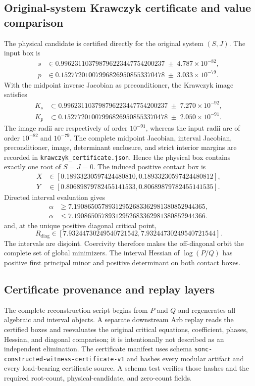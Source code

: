 \subsection{Original-system Krawczyk certificate and value comparison}
The physical candidate is certified directly for the original system $(S,J)$. The input box is
\begin{align*}
s&\in 0.996231103798796223447754200237\;\pm\;4.787\times 10^{-82},\\
p&\in 0.152772010079968269508553370478\;\pm\;3.033\times 10^{-79}.
\end{align*}
With the midpoint inverse Jacobian as preconditioner, the Krawczyk image satisfies
\begin{align*}
K_s&\subset 0.996231103798796223447754200237\;\pm\;7.270\times 10^{-92},\\
K_p&\subset 0.152772010079968269508553370478\;\pm\;2.050\times 10^{-91}.
\end{align*}
The image radii are respectively of order $10^{-91}$, whereas the input radii are of order $10^{-82}$ and $10^{-79}$. The complete midpoint Jacobian, interval Jacobian, preconditioner, image, determinant enclosure, and strict interior margins are recorded in \texttt{krawczyk\_certificate.json}. Hence the physical box contains exactly one root of $S=J=0$.
The induced positive contact box is
\begin{align*}
X&\in[0.18933230597424480810,0.18933230597424480812],\\
Y&\in[0.80689879782455141533,0.80689879782455141535].
\end{align*}
Directed interval evaluation gives
\begin{align*}
\alpha&\ge 7.19086505789312952683362981380852944365,\\
\alpha&\le 7.19086505789312952683362981380852944366.
\end{align*}
and, at the unique positive diagonal critical point,
\[
R_{\mathrm{diag}}\in[7.93244730249540721542,7.93244730249540721544].
\]
The intervals are disjoint. Coercivity therefore makes the off-diagonal orbit the complete set of global minimizers. The interval Hessian of $\log(P/Q)$ has positive first principal minor and positive determinant on both contact boxes.
\subsection{Certificate provenance and replay layers}
The complete reconstruction script begins from $P$ and $Q$ and regenerates all algebraic and interval objects. A separate downstream Arb replay reads the certified boxes and reevaluates the original critical equations, coefficient, phases, Hessian, and diagonal comparison; it is intentionally not described as an independent elimination. The certificate manifest uses schema \texttt{sonc-constructed-witness-certificate-v1} and hashes every modular artifact and every load-bearing certificate source. A schema test verifies those hashes and the required root-count, physical-candidate, and zero-count fields.
